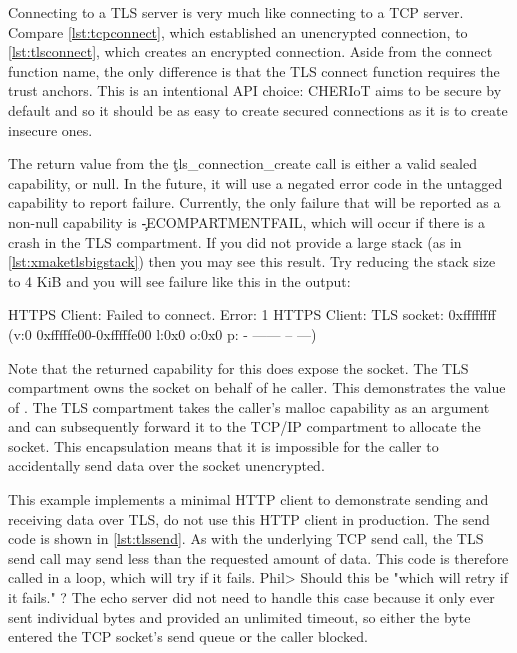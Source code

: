 \codelisting[filename=examples/tls/https.cc,marker=setup,label=lst:tlssetup,caption="Setup required before a TLS connection is possible."]{}

Connecting to a TLS server is very much like connecting to a TCP server.
Compare \ref{lst:tcpconnect}, which established an unencrypted connection, to \ref{lst:tlsconnect}, which creates an encrypted connection.
Aside from the connect function name, the only difference is that the TLS connect function requires the trust anchors.
This is an intentional API choice: CHERIoT aims to be secure by default and so it should be as easy to create secured connections as it is to create insecure ones.

\codelisting[filename=examples/tls/https.cc,marker=tls_connect,label=lst:tlsconnect,caption="Connecting to a remote server with TLS."]{}

The return value from the \c{tls_connection_create} call is either a valid sealed capability, or null.
In the future, it will use a negated error code in the untagged capability to report failure.
Currently, the only failure that will be reported as a non-null capability is \c{-ECOMPARTMENTFAIL}, which will occur if there is a crash in the TLS compartment.
If you did not provide a large stack (as in \ref{lst:xmaketlsbigstack}) then you may see this result.
Try reducing the stack size to 4 KiB and you will see failure like this in the output:

\begin{console}
HTTPS Client: Failed to connect.  Error: 1
HTTPS Client: TLS socket: 0xffffffff (v:0 0xfffffe00-0xfffffe00 l:0x0 o:0x0 p: - ------ -- ---)
\end{console}

Note that the returned capability for this does  expose the socket.
The TLS compartment owns the socket on behalf of he caller.
This demonstrates the value of .
The TLS compartment takes the caller's malloc capability as an argument and can subsequently forward it to the TCP/IP compartment to allocate the socket.
This encapsulation means that it is impossible for the caller to accidentally send data over the socket unencrypted.

This example implements a minimal HTTP client to demonstrate sending and receiving data over TLS, do not use this HTTP client in production.
The send code is shown in \ref{lst:tlssend}.
As with the underlying TCP send call, the TLS send call may send less than the requested amount of data.
This code is therefore called in a loop, which will try if it fails.
Phil> Should this be "which will retry if it fails." ?
The echo server did not need to handle this case because it only ever sent individual bytes and provided an unlimited timeout, so either the byte entered the TCP socket's send queue or the caller blocked.

